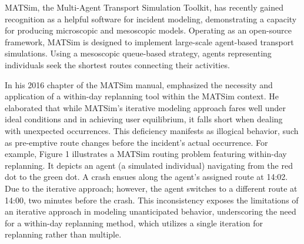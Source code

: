 \documentclass[
  letterpaper,
  authoryear]{elsarticle}
\begin{document}
MATSim, the Multi-Agent Transport Simulation Toolkit, has recently
gained recognition as a helpful software for incident modeling,
demonstrating a capacity for producing microscopic and mesoscopic
models. Operating as an open-source framework, MATSim is designed to
implement large-scale agent-based transport simulations. Using a
mesoscopic queue-based strategy, agents representing individuals seek
the shortest routes connecting their activities.

In his 2016 chapter of the MATSim manual, \citet{dobler2016} emphasized
the necessity and application of a within-day replanning tool within the
MATSim context. He elaborated that while MATSim's iterative modeling
approach fares well under ideal conditions and in achieving user
equilibrium, it falls short when dealing with unexpected occurrences.
This deficiency manifests as illogical behavior, such as pre-emptive
route changes before the incident's actual occurrence. For example,
Figure 1 illustrates a MATSim routing problem featuring within-day
replanning. It depicts an agent (a simulated individual) navigating from
the red dot to the green dot. A crash ensues along the agent's assigned
route at 14:02. Due to the iterative approach; however, the agent
switches to a different route at 14:00, two minutes before the crash.
This inconsistency exposes the limitations of an iterative approach in
modeling unanticipated behavior, underscoring the need for a within-day
replanning method, which utilizes a single iteration for replanning
rather than multiple.
\end{document}
